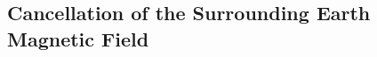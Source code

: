 
\FloatBarrier

\subsection{Cancellation of the Surrounding Earth Magnetic Field} \label{subsec:earthEli}

